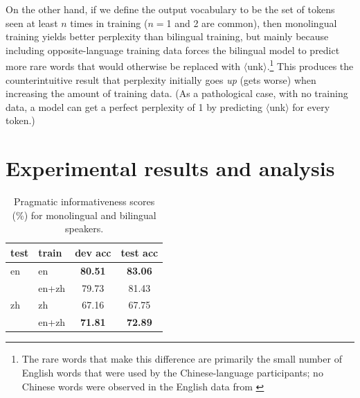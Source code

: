 \documentclass[11pt,a4paper]{article}
\renewcommand{\|}{\mid}
\begin{document}
On the other hand, if we define the output vocabulary
to be the set of tokens seen at least $n$ times in training ($n={}$1 and 2 are common), then monolingual training yields
better perplexity than bilingual training, but mainly because including opposite-language training data forces the
bilingual model to predict more rare words that would otherwise be replaced with $\langle$unk$\rangle$.\footnote{The rare
words that make this difference are primarily the small number of English words that were used by the Chinese-language participants;
no Chinese words were observed in the English data from \citet{Monroe2017}} %
This produces the counterintuitive result that perplexity initially goes \emph{up} (gets worse) when increasing the amount of
training data. (As a pathological case, with no training data, a model can get a perfect perplexity
of 1 by predicting $\langle$unk$\rangle$ for every token.)

\section{Experimental results and analysis}

\begin{table}[t]
\centering
\begin{tabular}{llcc}
\toprule
test & train & dev acc & test acc \\
\midrule
en     & en    & \textbf{80.51} & \textbf{83.06} \\
       & en+zh & 79.73          & 81.43 \\ %
\midrule
zh     & zh    & 67.16          & 67.75 \\
       & en+zh & \textbf{71.81} & \textbf{72.89} \\ %
\bottomrule
\end{tabular}
\caption{Pragmatic informativeness scores (\%) for monolingual and bilingual speakers.}
\label{tab:accuracy}
\end{table}
\end{document}
